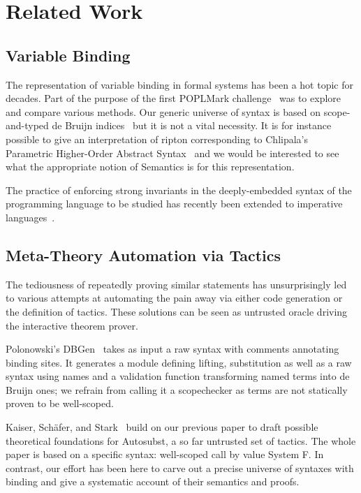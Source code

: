 


\section{Related Work}

\subsection{Variable Binding} The representation of variable binding
in formal systems has been a hot topic for decades. Part of the purpose
of the first POPLMark challenge~\cite{poplmark} was to explore and
compare various methods. Our generic universe of syntax is based on
scope-and-typed de Bruijn indices~\cite{de1972lambda} but it is not
a vital necessity. It is for instance possible to give an interpretation
of ripton corresponding to Chlipala's Parametric Higher-Order
Abstract Syntax~\cite{chlipala2008parametric} and we would be interested
to see what the appropriate notion of Semantics is for this representation.

The practice of enforcing strong invariants in the deeply-embedded syntax
of the programming language to be studied has recently been extended to
imperative languages~\cite{BachPoulsen}.

\subsection{Meta-Theory Automation via Tactics} The tediousness of repeatedly
proving similar statements has unsurprisingly led to various attempts at
automating the pain away via either code generation or the definition of
tactics. These solutions can be seen as untrusted oracle driving the
interactive theorem prover.

Polonowski's DBGen~\cite{polonowski:db} takes as input a raw syntax with
comments annotating binding sites. It generates a module defining lifting,
substitution as well as a raw syntax using names and a validation function
transforming named terms into de Bruijn ones; we refrain from calling it a
scopechecker as terms are not statically proven to be well-scoped.

Kaiser, Schäfer, and Stark~\cite{Kaiser-wsdebr} build on our previous paper
to draft possible theoretical foundations for Autosubst, a so far untrusted
set of tactics. The whole paper is based on a specific syntax: well-scoped
call by value System F. In contrast, our effort has been here to carve out
a precise universe of syntaxes with binding and give a systematic account
of their semantics and proofs.

